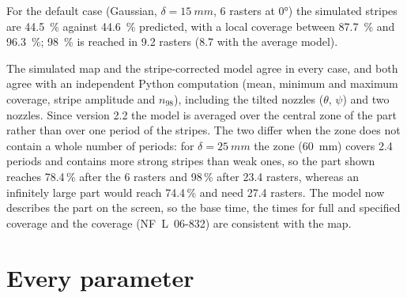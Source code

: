 \documentclass[11pt,a4paper]{article}
\begin{document}
For the default case (Gaussian, $\delta=\SI{15}{mm}$, 6 rasters at 0°) the simulated stripes are \SI{44.5}{\percent} against \SI{44.6}{\percent} predicted, with a local coverage between \SI{87.7}{\percent} and \SI{96.3}{\percent}; \SI{98}{\percent} is reached in 9.2 rasters (8.7 with the average model).

The simulated map and the stripe-corrected model agree in every case, and both agree with an independent Python computation (mean, minimum and maximum coverage, stripe amplitude and $n_{98}$), including the tilted nozzles ($\theta$, $\psi$) and two nozzles. Since version 2.2 the model is averaged over the central zone of the part rather than over one period of the stripes. The two differ when the zone does not contain a whole number of periods: for $\delta=\SI{25}{mm}$ the zone (\SI{60}{mm}) covers 2.4 periods and contains more strong stripes than weak ones, so the part shown reaches 78.4\,\% after the 6 rasters and 98\,\% after 23.4 rasters, whereas an infinitely large part would reach 74.4\,\% and need 27.4 rasters. The model now describes the part on the screen, so the base time, the times for full and specified coverage and the coverage (NF~L~06-832) are consistent with the map.


\section{Every parameter}\label{sec:params}
\end{document}
